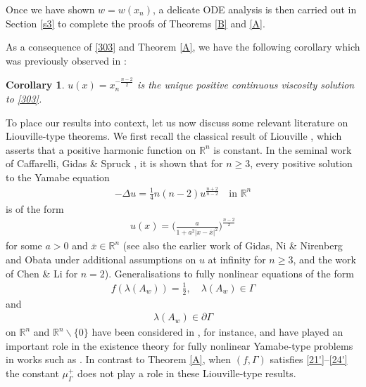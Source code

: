 \documentclass[12pt]{article}
\numberwithin{equation}{section}
\theoremstyle{plain}
\newtheorem{cor}[thm]{Corollary}
\theoremstyle{definition}
\begin{document}
Once we have shown $w=w(x_n)$, a delicate ODE analysis is then carried out in Section \ref{s3} to complete the proofs of Theorems \ref{B} and \ref{A}.  \medskip 




As a consequence of \eqref{303} and Theorem \ref{A}, we have the following corollary which was previously observed in \cite[Remark 2.4]{HS20}:
\begin{cor}\label{AA}
	$u(x) = x_n^{-\frac{n-2}{2}}$ is the unique positive continuous viscosity solution to \eqref{303}.
\end{cor}


To place our results into context, let us now discuss some relevant literature on Liouville-type theorems. We first recall the classical result of Liouville \cite{Liou1853}, which asserts that a positive harmonic function on $\mathbb{R}^n$ is constant. In the seminal work of Caffarelli, Gidas \& Spruck \cite{CGS89}, it is shown that for $n\geq 3$, every positive solution to the Yamabe equation
\begin{align*}
-\Delta u = \frac{1}{4}n(n-2)u^{\frac{n+2}{n-2}} \quad \text{in }\mathbb{R}^n 
\end{align*}
is of the form 
\begin{align*}
u(x) = \bigg(\frac{a}{1+a^2|x-\overline{x}|^2}\bigg)^{\frac{n-2}{2}}
\end{align*}
for some $a>0$ and $\overline{x}\in\mathbb{R}^n$ (see also the earlier work of Gidas, Ni \& Nirenberg \cite{GNN79} and Obata \cite{Ob71} under additional assumptions on $u$ at infinity for $n\geq 3$, and the work of Chen \& Li \cite{CC91} for $n=2$). Generalisations to fully nonlinear equations of the form
\begin{align}\label{202}
f(\lambda(A_w)) = \frac{1}{2}, \quad \lambda(A_w)\in\Gamma
\end{align}
and
\begin{align}\label{204}
\lambda(A_w)\in\partial\Gamma
\end{align}
on $\mathbb{R}^n$ and $\mathbb{R}^n\backslash\{0\}$ have been considered in \cite{Via00b, CGY02b, CGY03, LL03, LL05, Li07, Li09, CLL23, FMW23}, for instance, and have played an important role in the existence theory for fully nonlinear Yamabe-type problems in works such as \cite{CGY02b, LL03, LL05, GW06, GV07, LN14}. In contrast to Theorem \ref{A}, when $(f,\Gamma)$ satisfies \eqref{21'}--\eqref{24'} the constant $\mu_\Gamma^+$ does not play a role in these Liouville-type results.\medskip
\end{document}
